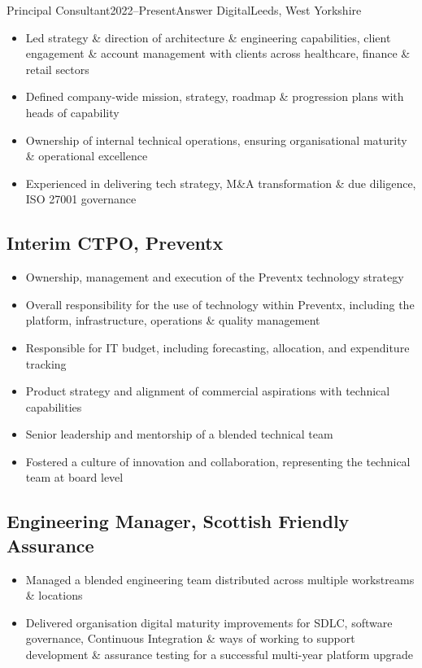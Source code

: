 \documentclass{cv}
\begin{document}
\begin{experienceplain}{Principal Consultant}{2022--Present}{Answer Digital}{Leeds, West Yorkshire}
\begin{itemize}
\item Led strategy \& direction of architecture \& engineering capabilities, client engagement
      \& account management with clients across healthcare, finance \& retail sectors
\item Defined company-wide mission, strategy, roadmap \& progression plans with heads of capability
\item Ownership of internal technical operations, ensuring organisational maturity \& operational excellence
\item Experienced in delivering tech strategy, M\&A transformation \& due diligence, ISO 27001 governance
\end{itemize}

\subsection{Interim CTPO, Preventx}
\begin{itemize}
\item Ownership, management and execution of the Preventx technology strategy
\item Overall responsibility for the use of technology within Preventx, including the platform,
      infrastructure, operations \& quality management
\item Responsible for IT budget, including forecasting, allocation, and expenditure tracking
\item Product strategy and alignment of commercial aspirations with technical capabilities
\item Senior leadership and mentorship of a blended technical team
\item Fostered a culture of innovation and collaboration, representing the technical team at board level
\end{itemize}

\subsection{Engineering Manager, Scottish Friendly Assurance}
\begin{itemize}
\item Managed a blended engineering team distributed across multiple workstreams \& locations
\item Delivered organisation digital maturity improvements for SDLC, software governance,
      Continuous Integration \& ways of working to support development \& assurance testing for a
      successful multi-year platform upgrade
\end{itemize}


\end{experienceplain}
\end{document}

